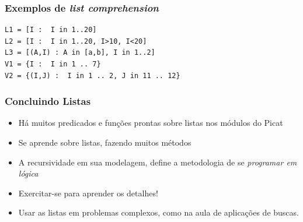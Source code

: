\begin{frame}[fragile, allowframebreaks=0.9]

\frametitle{Exemplos de \textit{list comprehension}}


\begin{verbatim}
L1 = [I :  I in 1..20]
L2 = [I :  I in 1..20, I>10, I<20]
L3 = [(A,I) : A in [a,b], I in 1..2]
V1 = {I :  I in 1 .. 7}
V2 = {(I,J) :  I in 1 .. 2, J in 11 .. 12}
\end{verbatim}

\end{frame}


\begin{frame}[fragile]
\frametitle{Concluindo Listas}

\begin{block}{}
\begin{itemize}
  \item Há muitos predicados e funções prontas sobre listas nos módulos do Picat
  \pause
  \item Se aprende sobre listas, fazendo muitos métodos
    \pause
  \item A recursividade em sua modelagem, define a metodologia de se \textit{programar em lógica}
    \pause
  \item Exercitar-se para aprender os detalhes!
    \pause
  \item Usar as listas em problemas complexos, como na aula de aplicações de buscas.
  
\end{itemize}

\end{block}

\end{frame}




